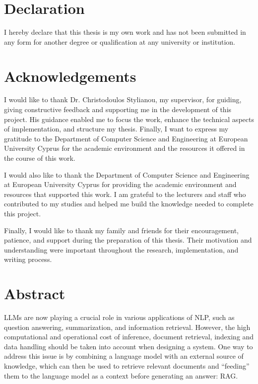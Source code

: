 \hypersetup{pageanchor=false}
\pagestyle{empty}

\chapter*{Declaration}
\thispagestyle{empty}
I hereby declare that this thesis is my own work and has not been submitted in any form for another degree or qualification at any university or institution.

\clearpage
\chapter*{Acknowledgements}
\thispagestyle{empty}
I would like to thank Dr. Christodoulos Stylianou, my supervisor, for guiding, giving constructive feedback and supporting me in the development of this project. His guidance enabled me to focus the work, enhance the technical aspects of implementation, and structure my thesis. Finally, I want to express my gratitude to the Department of Computer Science and Engineering at European University Cyprus for the academic environment and the resources it offered in the course of this work.

I would also like to thank the Department of Computer Science and Engineering at European University Cyprus for providing the academic environment and resources that supported this work. I am grateful to the lecturers and staff who contributed to my studies and helped me build the knowledge needed to complete this project.

Finally, I would like to thank my family and friends for their encouragement, patience, and support during the preparation of this thesis. Their motivation and understanding were important throughout the research, implementation, and writing process.

\clearpage
\chapter*{Abstract}
\thispagestyle{empty}
\acp{LLM} are now playing a crucial role in various applications of \ac{NLP}, such as question answering, summarization, and information retrieval. However, the high computational and operational cost of inference, document retrieval, indexing and data handling should be taken into account when designing a system. One way to address this issue is by combining a language model with an external source of knowledge, which can then be used to retrieve relevant documents and “feeding” them to the language model as a context before generating an answer: \ac{RAG}. 

